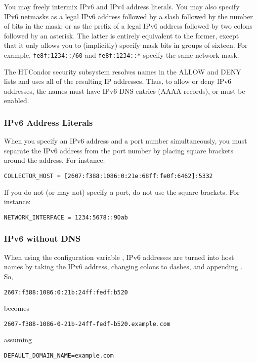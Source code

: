 You may freely intermix IPv6 and IPv4 address literals.  You may also specify
IPv6 netmasks as a legal IPv6 address followed by a slash followed by the
number of bits in the mask; or as the prefix of a legal IPv6 address followed
by two colons followed by an asterisk.  The latter is entirely equivalent to the
former, except that it only allows you to (implicitly) specify mask bits
in groups of sixteen.  For example, \texttt{fe8f:1234::/60} and
\texttt{fe8f:1234::*} specify the same network mask.

The HTCondor security subsystem resolves names in the ALLOW and DENY
lists and uses all of the resulting IP addresses.  Thus, to allow or deny
IPv6 addresses, the names must have IPv6 DNS entries (AAAA records), or
 must be enabled.

\subsubsection{IPv6 Address Literals}

When you specify an IPv6 address and a port number simultaneously, you
must separate the IPv6 address from the port number by placing square
brackets around the address.  For instance:

\begin{verbatim}
COLLECTOR_HOST = [2607:f388:1086:0:21e:68ff:fe0f:6462]:5332
\end{verbatim}

If you do not (or may not) specify a port, do not use the square brackets.
For instance:

\begin{verbatim}
NETWORK_INTERFACE = 1234:5678::90ab
\end{verbatim}

\subsubsection{IPv6 without DNS}

When using the configuration variable ,
IPv6 addresses are turned into host names by taking the IPv6 address,
changing colons to dashes, and appending .
So,
\begin{verbatim}
2607:f388:1086:0:21b:24ff:fedf:b520
\end{verbatim}
becomes
\begin{verbatim}
2607-f388-1086-0-21b-24ff-fedf-b520.example.com
\end{verbatim}
assuming
\begin{verbatim}
DEFAULT_DOMAIN_NAME=example.com
\end{verbatim}

